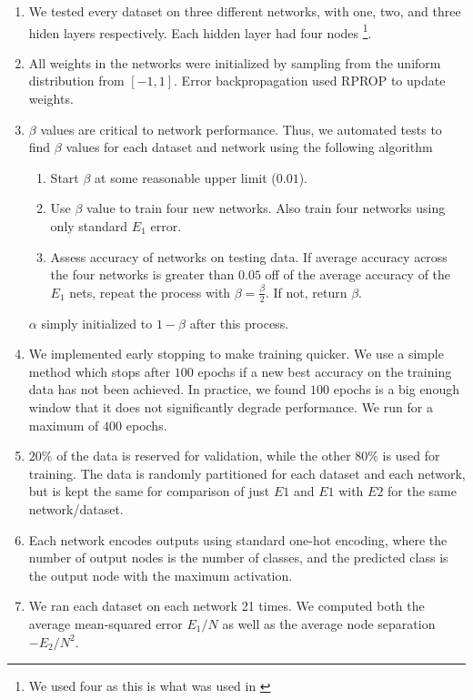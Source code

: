 \begin{enumerate}
\item
  We tested every dataset on three different networks, with one,
  two, and three hiden layers respectively. Each hidden layer had
  four nodes \footnote{We used four as this is what was used in \cite{thuan11}}.
\item
  All weights in the networks were initialized by sampling from the
  uniform distribution from $[-1,1]$. Error backpropagation used RPROP
  to update weights.
\item
  $\beta$ values are critical to network performance. Thus, we automated
  tests to find $\beta$ values for each dataset and network using the
  following algorithm
  \begin{enumerate}
  \item
    Start $\beta$ at some reasonable upper limit ($0.01$).
  \item
    Use $\beta$ value to train four new networks. Also train four
    networks using only standard $E_1$ error.
  \item
    Assess accuracy of networks on testing data. If average accuracy
    across the four networks is greater than $0.05$ off of the average
    accuracy of the $E_1$ nets, repeat the process with
    $\beta = \frac{\beta}{2}$. If not, return $\beta$.    
  \end{enumerate}
  $\alpha$ simply initialized to $1-\beta$ after this process.
\item
  We implemented early stopping to make training quicker. We use a simple
  method which stops after $100$ epochs if a new best accuracy on the
  training data has not been achieved. In practice, we found $100$ epochs is
  a big enough window that it does not significantly degrade performance.
  We run for a maximum of $400$ epochs.
\item
  $20\%$ of the data is reserved for validation, while the other $80\%$ is
  used for training. The data is randomly partitioned for each dataset and
  each network, but is kept the same for comparison of just $E1$ and $E1$
  with $E2$ for the same network/dataset.
\item
  Each network encodes outputs using standard one-hot encoding, where the number
  of output nodes is the number of classes, and the predicted class is the
  output node with the maximum activation.
\item
  We ran each dataset on each network 21 times. We computed both the average
  mean-squared error $E_1/N$ as well as the average node separation
  $-E_2/N^2$.
\end{enumerate}


